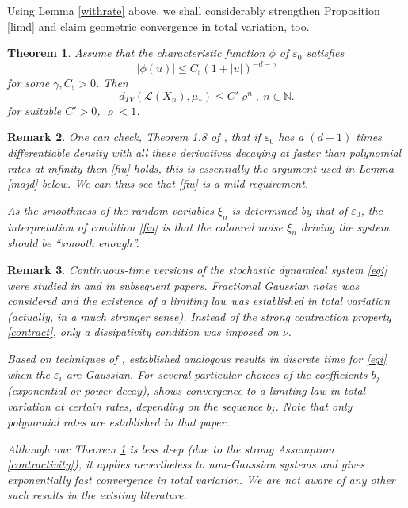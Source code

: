 \documentclass{article}
\newtheorem{theorem}{Theorem}[section]
\newtheorem{remark}[theorem]{Remark}
\begin{document}
Using Lemma \ref{withrate} above, we shall considerably strengthen Proposition \ref{limd} and
claim geometric convergence in total variation, too.

\begin{theorem}\label{lime} Assume that the characteristic function $\phi$ of $\varepsilon_{0}$
satisfies
\begin{equation}\label{fiu}
|\phi(u)|\leq C_{\flat}(1+|u|)^{-d-\gamma}
\end{equation} for some $\gamma, C_{\flat}>0$. Then 
$$
d_{TV}(\mathcal{L}(X_{n}),\mu_{*})\leq C'\varrho^{n},\ n\in\mathbb{N}.
$$	
for suitable $C'>0$, $\varrho<1$.
\end{theorem}

\begin{remark}
{\rm One can check, Theorem 1.8 of \cite{fourier}, that if $\varepsilon_{0}$ has a $(d+1)$ times
differentiable density with all these derivatives decaying at faster than polynomial rates at infinity then \eqref{fiu} holds, this
is essentially the argument used in Lemma \ref{majd} below. We can thus see that \eqref{fiu} is a mild requirement.

As the smoothness of the random variables $\xi_{n}$ is determined by that of $\varepsilon_{0}$,
the interpretation of condition \eqref{fiu} is that the coloured noise $\xi_{n}$ driving the system
should be ``smooth enough''.}	
\end{remark}

\begin{remark}
{\rm Continuous-time versions of the stochastic dynamical system \eqref{eqi}
were studied in \cite{hairer} and in subsequent papers. Fractional Gaussian noise 
was considered and the existence of a limiting law was established in total variation (actually,
in a much stronger sense). Instead of the strong contraction property \eqref{contract},   
only a dissipativity condition was imposed on $\nu$. 

Based on techniques of \cite{hairer}, \cite{varvenne} established
analogous results in discrete time for \eqref{eqi} when the $\varepsilon_{i}$ are Gaussian.
For several particular choices of the coefficients $b_{j}$ (exponential or power decay), \cite{varvenne} shows convergence
to a limiting law in total variation at certain rates, depending on the sequence $b_{j}$. 
Note that only polynomial rates are established in that paper.

Although our Theorem \ref{lime} is less deep (due to the strong Assumption \ref{contractivity}), 
it applies nevertheless to non-Gaussian systems and gives exponentially fast convergence in total variation.
We are not aware of any other such results in the existing literature.}
\end{remark}
\end{document}
